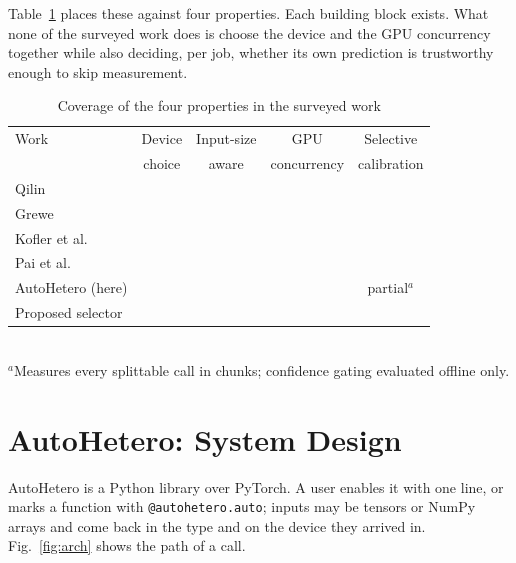 \documentclass[conference]{IEEEtran}
\newcommand{\cmark}{\ding{51}}
\newcommand{\xmark}{\ding{55}}
\begin{document}
Table~\ref{tab:gap} places these against four properties. Each building block exists. What none of the surveyed work does is choose the device and the GPU concurrency together while also deciding, per job, whether its own prediction is trustworthy enough to skip measurement.

\begin{table}[t]
\centering
\caption{Coverage of the four properties in the surveyed work}
\label{tab:gap}
\setlength{\tabcolsep}{2.5pt}
\begin{tabular}{@{}lcccc@{}}
\toprule
Work & Device & Input-size & GPU & Selective \\
     & choice & aware & concurrency & calibration \\
\midrule
Qilin~\cite{qilin} & \cmark & \cmark & \xmark & \xmark \\
Grewe~\cite{grewe11} & \cmark & \xmark & \xmark & \xmark \\
Kofler et al.~\cite{kofler} & \cmark & \cmark & \xmark & \xmark \\
Pai et al.~\cite{pai} & \xmark & \xmark & \cmark & \xmark \\
AutoHetero (here) & \cmark & \cmark & \xmark & partial$^{a}$ \\
Proposed selector & \cmark & \cmark & \cmark & \cmark \\
\bottomrule
\end{tabular}\\[2pt]
\footnotesize{$^{a}$Measures every splittable call in chunks; confidence gating evaluated offline only.}
\end{table}

\section{AutoHetero: System Design}
\label{sec:system}

AutoHetero is a Python library over PyTorch. A user enables it with one line, or marks a function with \texttt{@autohetero.auto}; inputs may be tensors or NumPy arrays and come back in the type and on the device they arrived in. Fig.~\ref{fig:arch} shows the path of a call.
\end{document}
